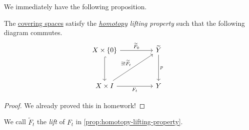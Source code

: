 We immediately have the following proposition.
\begin{proposition}\label{prop:homotopy-lifting-property}
	The \hyperref[def:covering-space]{covering spaces} satisfy the \emph{\hyperref[def:homotopy]{homotopy} lifting property} such that
	the following diagram commutes.
	\[
		\begin{tikzcd}
			{X\times \{0\}} && {\widetilde{Y} } \\
			\\
			{X\times I} && Y
			\arrow["{F_t}"', from=3-1, to=3-3]
			\arrow[hook, from=1-1, to=3-1]
			\arrow["{\widetilde{F}_0 }", from=1-1, to=1-3]
			\arrow["p", from=1-3, to=3-3]
			\arrow["{\exists ! \widetilde{F}_t }", from=3-1, to=1-3]
		\end{tikzcd}
	\]
\end{proposition}
\begin{proof}
	We already proved this in homework!
\end{proof}

\begin{definition}[Lift]\label{def:lift}
	We call \(\widetilde{F} _t\) the \emph{lift} of \(F_t\) in \autoref{prop:homotopy-lifting-property}.
\end{definition}

